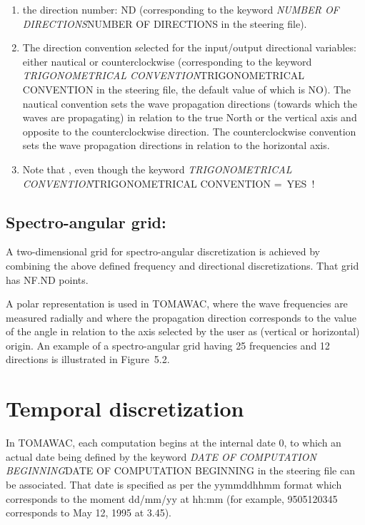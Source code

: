 \begin{enumerate}
\item  the direction number: ND (corresponding to the keyword \textit{NUMBER OF DIRECTIONS}NUMBER OF DIRECTIONS\textit{ }in the steering file).

\item  The direction convention selected for the input/output directional variables: either nautical or counterclockwise (corresponding to the keyword \textit{TRIGONOMETRICAL CONVENTION}TRIGONOMETRICAL CONVENTION\textit{ }in the steering file, the default value of which is NO). The nautical convention sets the wave propagation directions (towards which the waves are propagating) in relation to the true North or the vertical axis and opposite to the counterclockwise direction. The counterclockwise convention sets the wave propagation directions in relation to the horizontal axis.

\item  Note that , even though the keyword \textit{TRIGONOMETRICAL CONVENTION}TRIGONOMETRICAL CONVENTION\textit{ }=~YES~!
\end{enumerate}


\subsection{ Spectro-angular grid:}

 A two-dimensional grid for spectro-angular discretization is achieved by combining the above defined frequency and directional discretizations. That grid has NF.ND points.

 A polar representation is used in TOMAWAC, where the wave frequencies are measured radially and where the propagation direction corresponds to the value of the angle in relation to the axis selected by the user as (vertical or horizontal) origin. An example of a spectro-angular grid having 25 frequencies and 12 directions is illustrated in Figure~5.2.


\section{ Temporal discretization}

 In TOMAWAC, each computation begins at the internal date 0, to which an actual date being defined by the keyword \textit{DATE OF COMPUTATION BEGINNING}DATE OF COMPUTATION BEGINNING\textit{ }in the steering file can be associated. That date is specified as per the yymmddhhmm format which corresponds to the moment dd/mm/yy at hh:mm (for example, 9505120345 corresponds to May 12, 1995 at 3.45).

